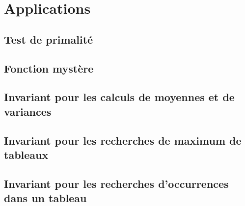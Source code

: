 \section{Applications}
\subsection{Test de primalité}
\setcounter{thequestion}{0}

\subsection{Fonction mystère}
\setcounter{thequestion}{0}

\subsection{Invariant pour les calculs de moyennes et de variances}
\setcounter{thequestion}{0}

\subsection{Invariant pour les recherches de maximum de tableaux}
\setcounter{thequestion}{0}

\subsection{Invariant pour les recherches d'occurrences dans un tableau}
\setcounter{thequestion}{0}

